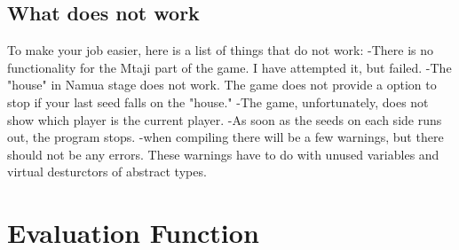 \documentclass[a4paper]{article}
\begin{document}
	\subsection{What does not work}
	To make your job easier, here is a list of things that do not work: \newline
	-There is no functionality for the Mtaji part of the game. I have attempted it, but failed. \newline
	-The "house" in Namua stage does not work. The game does not provide a option to stop if your last seed falls on the 				"house."\newline
	-The game, unfortunately, does not show which player is the current player.\newline
	-As soon as the seeds on each side runs out, the program stops.\newline
	-when compiling there will be a few warnings, but there should not be any errors. These warnings have to do with unused 			variables and virtual desturctors of abstract types.
	
	

\section{Evaluation Function}
\end{document}
